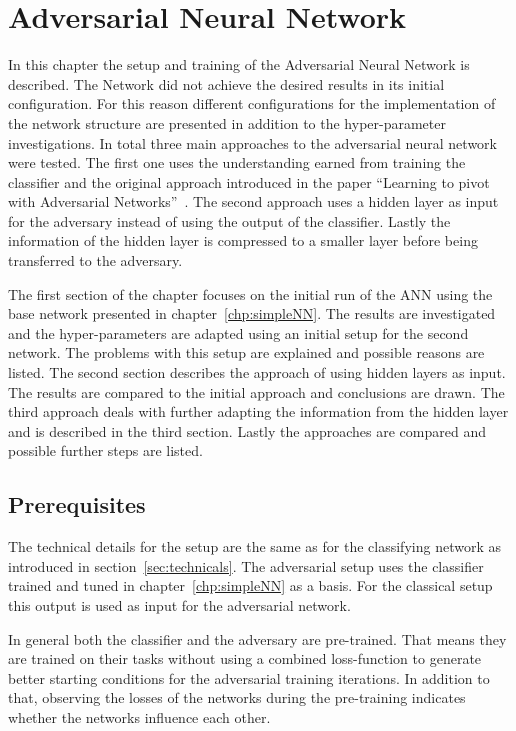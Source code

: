 \chapter{Adversarial Neural Network}
\label{chp:ANN}

In this chapter the setup and training of the Adversarial Neural Network is described. The Network did not achieve the desired results in its initial configuration.
For this reason different configurations for the implementation of the network structure are presented in addition to the hyper-parameter investigations.
In total three main approaches to the adversarial neural network were tested. The first one uses the understanding earned from training the classifier and the original approach introduced in the paper \enquote{Learning to pivot with Adversarial Networks}~\cite{Louppe:2016ylz}. The second approach uses a hidden layer as input for the adversary instead of using the output of the classifier. Lastly the information of the hidden layer is compressed to a smaller layer before being transferred to the adversary.

The first section of the chapter focuses on the initial run of the ANN using the base network presented in chapter~\ref{chp:simpleNN}. The results are investigated and the hyper-parameters are adapted using an initial setup for the second network. The problems with this setup are explained and possible reasons are listed.
The second section describes the approach of using hidden layers as input. The results are compared to the initial approach and conclusions are drawn.
The third approach deals with further adapting the information from the hidden layer and is described in the third section.
Lastly the approaches are compared and possible further steps are listed.

\section*{Prerequisites}

The technical details for the setup are the same as for the classifying network as introduced in section~\ref{sec:technicals}.
The adversarial setup uses the classifier trained and tuned in chapter~\ref{chp:simpleNN} as a basis. For the classical setup this output is used as input for the adversarial network.

In general both the classifier and the adversary are pre-trained. That means they are trained on their tasks without using a combined loss-function to generate better starting conditions for the adversarial training iterations.
In addition to that, observing the losses of the networks during the pre-training indicates whether the networks influence each other.


